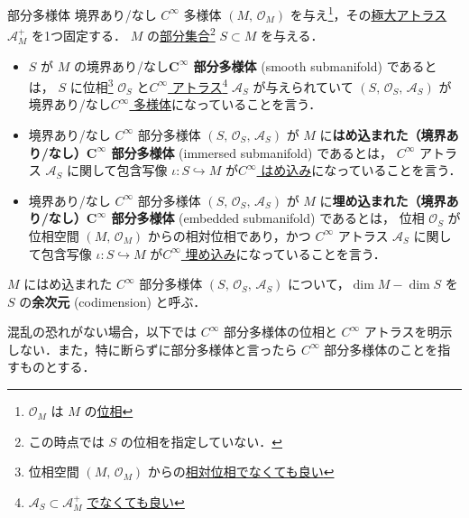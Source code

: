 \documentclass[geometry_main]{subfiles}
\begin{document}
\begin{mydef}[label=def:submanifold,breakable]{部分多様体}
	境界あり/なし $C^\infty$ 多様体 $(M,\, \mathscr{O}_M)$ を与え\footnote{$\mathscr{O}_M$ は $M$ の\hyperref[ax.topo]{位相}}，その\hyperref[maxatlas]{極大アトラス} $\mathcal{A}_M^+$ を1つ固定する．
	$M$ の\underline{部分集合}\footnote{この時点では $S$ の位相を指定していない．} $S \subset M$ を与える．
	\begin{itemize}
		\item $S$ が $M$ の境界あり/なし\textbf{$\bm{C^\infty}$ 部分多様体} (smooth submanifold) であるとは，
		$S$ に位相\footnote{位相空間 $(M,\, \mathscr{O}_M)$ からの\hyperref[def.reltopo]{相対位相}\underline{でなくても良い}} $\mathscr{O}_S$ と\hyperref[diffmani]{$C^\infty$ アトラス}\footnote{$\mathcal{A}_S \subset \mathcal{A}_M^+$ \underline{でなくても良い}} $\mathcal{A}_S$ が与えられていて $(S,\, \mathscr{O}_S,\, \mathcal{A}_S)$ が境界あり/なし\hyperref[diffmani]{$C^\infty$ 多様体}になっていることを言う．
		\item 境界あり/なし $C^\infty$ 部分多様体 $(S,\, \mathscr{O}_S,\, \mathcal{A}_S)$ が $M$ に\textbf{はめ込まれた（境界あり/なし）$\bm{C^\infty}$ 部分多様体} (immersed submanifold) であるとは，
		$C^\infty$ アトラス $\mathcal{A}_S$ に関して包含写像 $\iota \colon S \hookrightarrow M$ が\hyperref[def:submersion-smooth]{$C^\infty$ はめ込み}になっていることを言う．
		\item 境界あり/なし $C^\infty$ 部分多様体 $(S,\, \mathscr{O}_S,\, \mathcal{A}_S)$ が $M$ に\textbf{埋め込まれた（境界あり/なし）$\bm{C^\infty}$ 部分多様体} (embedded submanifold) であるとは，
		位相 $\mathscr{O}_S$ が位相空間 $(M,\, \mathscr{O}_M)$ からの相対位相であり，かつ
		$C^\infty$ アトラス $\mathcal{A}_S$ に関して包含写像 $\iota \colon S \hookrightarrow M$ が\hyperref[def:submersion-smooth]{$C^\infty$ 埋め込み}になっていることを言う．
	\end{itemize}
	
	\tcblower

	$M$ にはめ込まれた $C^\infty$ 部分多様体 $(S,\, \mathscr{O}_S,\, \mathcal{A}_S)$ について，$\dim M - \dim S$ を $S$ の\textbf{余次元} (codimension) と呼ぶ．
\end{mydef}

混乱の恐れがない場合，以下では $C^\infty$ 部分多様体の位相と $C^\infty$ アトラスを明示しない．また，特に断らずに部分多様体と言ったら $C^\infty$ 部分多様体のことを指すものとする．
\end{document}
